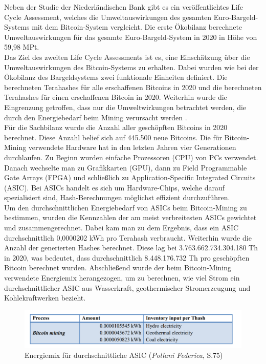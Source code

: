 Neben der Studie der Niederländischen Bank gibt es ein veröffentlichtes Life Cycle Assessment, welches die Umweltauswirkungen des gesamten Euro-Bargeld-Systems mit dem Bitcoin-System vergleicht. Die erste Ökobilanz berechnete Umweltauswirkungen für das gesamte Euro-Bargeld-System in 2020 in Höhe von 59,98 MPt.\\
Das Ziel des zweiten Life Cycle Assessments ist es, eine Einschätzung über die Umweltauswirkungen des Bitcoin-Systems zu erhalten. Dabei wurden wie bei der Ökobilanz des Bargeldsystems zwei funktionale Einheiten definiert. Die berechneten Terahashes für alle erschaffenen Bitcoins in 2020 und die berechneten Terahashes für einen erschaffenen Bitcoin in 2020. Weiterhin wurde die Eingrenzung getroffen, dass nur die Umweltwirkungen betrachtet werden, die durch den Energiebedarf beim Mining verursacht werden .\\
Für die Sachbilanz wurde die Anzahl aller geschöpften Bitcoins in 2020 berechnet. Diese Anzahl belief sich auf 445.500 neue Bitcoins. Die für Bitcoin-Mining verwendete Hardware hat in den letzten Jahren vier Generationen durchlaufen. Zu Beginn wurden einfache Prozessoren (CPU) von PCs verwendet. Danach wechselte man zu Grafikkarten (GPU), dann zu Field Programmable Gate Arrays (FPGA) und schließlich zu Application-Specific Integrated Circuits (ASIC). Bei ASICs handelt es sich um Hardware-Chips, welche darauf spezialisiert sind, Hash-Berechnungen möglichst effizient durchzuführen.\\
Um den durchschnittlichen Energiebedarf von ASICs beim Bitcoin-Mining zu bestimmen, wurden die Kennzahlen der am meist verbreitesten ASICs gewichtet und zusammengerechnet. Dabei kam man zu dem Ergebnis, dass ein ASIC durchschnittlich 0,0000202 kWh pro Terahash verbraucht. Weiterhin wurde die Anzahl der generierten Hashes berechnet. Diese lag bei 3.763.662.734.304.180 Th in 2020, was bedeutet, dass durchschnittlich 8.448.176.732 Th pro geschöpften Bitcoin berechnet wurden. Abschließend wurde der beim Bitcoin-Mining verwendete Energiemix herangezogen, um zu berechnen, wie viel Strom ein durchschnittlicher ASIC aus Wasserkraft, geothermischer Stromerzeugung und Kohlekraftwerken bezieht.
\FloatBarrier
\begin{figure}[ht!]
    \centering
    \includegraphics[width=.75\textwidth]{quellen/btc_mining_numbers.png}
    \caption[Energiemix für durchschnittliche ASIC]{Energiemix für durchschnittliche ASIC (\textit{Pollani Federica}, S.75)}
\end{figure}
